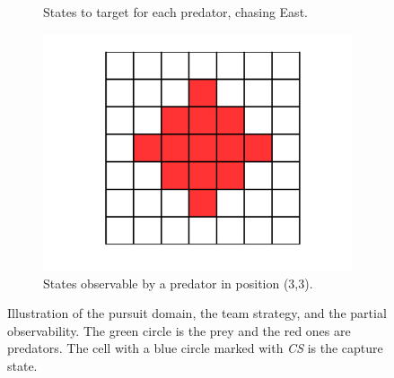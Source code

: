\begin{figure}[t]
\begin{subfigure}[t]{0.19\textwidth}
\caption{States to target for each predator, chasing East.}
\label{fig:role11}
\end{subfigure}
\begin{subfigure}[t]{0.19\textwidth}
\centering
\captionsetup{width=0.9\textwidth}
\includegraphics[trim=7cm 3cm 6cm 2cm, clip=true, width=\gridwidth\textwidth]{plots/visuals/visibleStatesMiddle.png}
\caption{States observable by a predator in position (3,3).}
\label{fig:visiblecenter}
\end{subfigure}
\caption{Illustration of the pursuit domain, the team strategy, and the partial observability. The green circle is the prey and the red ones are predators. The cell with a blue circle marked with \small{\emph{CS}} is the capture state.\vspace{-0.3cm}}
\label{fig:illustration}
\end{figure}

